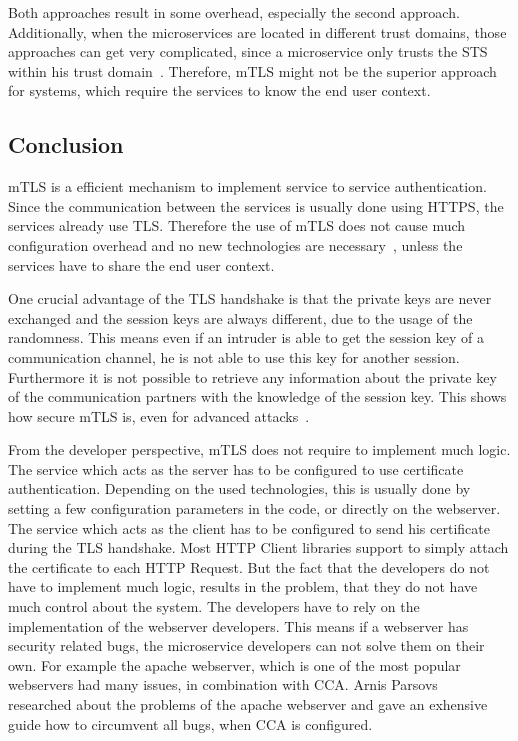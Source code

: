 Both approaches result in some overhead, especially the second approach.
Additionally, when the microservices are located in different trust domains, those approaches can get very complicated, since a microservice only trusts the STS within his trust domain~\cite{dias2020microservices}.
Therefore, mTLS might not be the superior approach for systems, which require the services to know the end user context.

\subsection{Conclusion}
mTLS is a efficient mechanism to implement service to service authentication.
Since the communication between the services is usually done using HTTPS, the services already use TLS.
Therefore the use of mTLS does not cause much configuration overhead and no new technologies are necessary~\cite{dias2020microservices}, unless the services have to share the end user context.

One crucial advantage of the TLS handshake is that the private keys are never exchanged and the session keys are always different, due to the usage of the randomness.
This means even if an intruder is able to get the session key of a communication channel, he is not able to use this key for another session.
Furthermore it is not possible to retrieve any information about the private key of the communication partners with the knowledge of the session key.
This shows how secure mTLS is, even for advanced attacks~\cite{parsovs2013practical}.

From the developer perspective, mTLS does not require to implement much logic.
The service which acts as the server has to be configured to use certificate authentication.
Depending on the used technologies, this is usually done by setting a few configuration parameters in the code, or directly on the webserver.
The service which acts as the client has to be configured to send his certificate during the TLS handshake.
Most HTTP Client libraries support to simply attach the certificate to each HTTP Request.
But the fact that the developers do not have to implement much logic, results in the problem, that they do not have much control about the system.
The developers have to rely on the implementation of the webserver developers.
This means if a webserver has security related bugs, the microservice developers can not solve them on their own.
For example the apache webserver, which is one of the most popular webservers had many issues, in combination with CCA.
Arnis Parsovs~\cite{parsovs2013practical} researched about the problems of the apache webserver and gave an exhensive guide how to circumvent all bugs, when CCA is configured.

